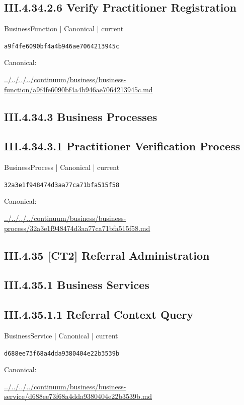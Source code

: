 \documentclass[10pt,a4paper]{article}
\begin{document}
\subsection*{III.4.34.2.6 Verify Practitioner Registration}
{\small BusinessFunction | Canonical | current}\par
\texttt{a9f4fe6090bf4a4b946ae7064213945c}\par
Canonical: \par
{\footnotesize\url{../../../../continuum/business/business-function/a9f4fe6090bf4a4b946ae7064213945c.md}}\par
\subsection*{III.4.34.3 Business Processes}
\subsection*{III.4.34.3.1 Practitioner Verification Process}
{\small BusinessProcess | Canonical | current}\par
\texttt{32a3e1f948474d3aa77ca71bfa515f58}\par
Canonical: \par
{\footnotesize\url{../../../../continuum/business/business-process/32a3e1f948474d3aa77ca71bfa515f58.md}}\par
\subsection*{III.4.35 [CT2] Referral Administration}
\subsection*{III.4.35.1 Business Services}
\subsection*{III.4.35.1.1 Referral Context Query}
{\small BusinessService | Canonical | current}\par
\texttt{d688ee73f68a4dda9380404e22b3539b}\par
Canonical: \par
{\footnotesize\url{../../../../continuum/business/business-service/d688ee73f68a4dda9380404e22b3539b.md}}\par
\end{document}
